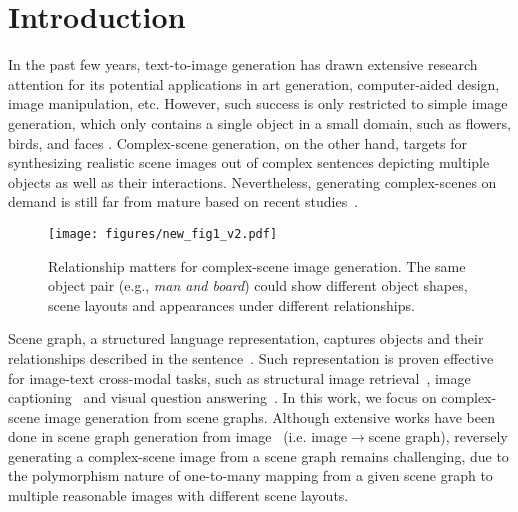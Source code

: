 \section{Introduction}

In the past few years, text-to-image generation has drawn extensive research attention for its potential applications in art generation, computer-aided design, image manipulation, etc. However, such success is only restricted to simple image generation, which only contains a single object in a small domain, such as flowers, birds, and faces \cite{reed2016generative,bao2017cvae}. Complex-scene generation, on the other hand, targets for synthesizing realistic scene images out of complex sentences depicting multiple objects as well as their interactions. Nevertheless, generating complex-scenes on demand is still far from mature based on recent studies~\cite{johnson2018image, xu2018attngan, li2019object,hinz2019generating}.

\begin{figure}[!t]
\centering
\texttt{[image: figures/new\_fig1\_v2.pdf]}
\caption{Relationship matters for complex-scene image generation. The same object pair (e.g., \textit{man and board}) could show different object shapes, scene layouts and appearances under different relationships.} 
\label{fig:intro_cases}
\end{figure}

Scene graph, a structured language representation, captures objects and their relationships described in the sentence~\cite{xu2017scene}. Such representation is proven effective for image-text cross-modal tasks, such as structural image retrieval~\cite{johnson2015image,schuster2015generating,johnson2018image}, image captioning~\cite{yang2019auto,li2019know,li2018jointly} and visual question answering~\cite{teney2017graph,norcliffe2018learning}. %
In this work, we focus on complex-scene image generation from scene graphs. Although extensive works have been done in scene graph generation from image~\cite{xu2017scene,zellers2018neural,msdn,vtrans} (i.e. image$\rightarrow$scene graph), reversely generating a complex-scene image from a scene graph remains challenging, due to the polymorphism nature of one-to-many mapping from a given scene graph to multiple reasonable images with different scene layouts.

